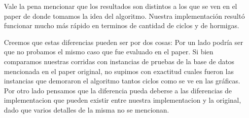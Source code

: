\documentclass[a4paper,spanish]{article}
\begin{document}
Vale la pena mencionar que los resultados son distintos a los que se ven en el paper de donde tomamos
la idea del algoritmo. Nuestra implementación resultó funcionar mucho más rápido en terminos de cantidad
de ciclos y de hormigas.

Creemos que estas diferencias pueden ser por dos cosas: 
Por un lado podría ser que no probamos el mismo caso que fue evaluado en el paper. Si bien comparamos nuestras
corridas con instancias de pruebas de la base de datos mencionada en el paper original, no supimos con exactitud 
cuales fueron las instancias que demoraron el algoritmo tantos ciclos como se ve en las gráficas.
Por otro lado pensamos que la diferencia pueda deberse a las diferencias de implementacion que pueden existir
entre nuestra implementacion y la original, dado que varios detalles de la misma no se mencionan.


\clearpage


\end{document}
